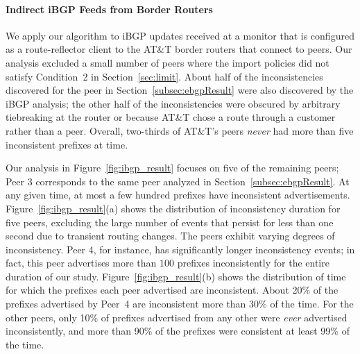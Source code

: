 \paragraph{Indirect iBGP Feeds from Border Routers} \label{subsec:ibgpResult}


We apply our algorithm to iBGP updates received at a monitor that is
configured as a route-reflector client to the AT\&T border routers
that connect to peers.  Our analysis excluded a small number of peers
where the import policies did not satisfy Condition~2 in
Section~\ref{sec:limit}.  About half of the inconsistencies discovered
for the peer in Section~\ref{subsec:ebgpResult} were also discovered
by the iBGP analysis; the other half of the inconsistencies were
obscured by arbitrary tiebreaking at the router or because AT\&T
chose a route through a customer rather than a peer.  Overall,
two-thirds of AT\&T's peers {\em never\/} had more than five
inconsistent prefixes at time.

Our analysis in Figure~\ref{fig:ibgp_result} focuses on five of the
remaining peers; Peer 3 corresponds to the same peer analyzed in
Section~\ref{subsec:ebgpResult}.  At any given time, at most a few
hundred prefixes have inconsistent advertisements.
Figure~\ref{fig:ibgp_result}(a) shows the distribution of
inconsistency duration for five peers, excluding the large number of
events that persist for less than one second due to transient routing
changes.  The peers exhibit varying degrees of inconsistency.  Peer 4,
for instance, has significantly longer inconsistency events; in fact,
this peer advertises more than $100$ prefixes inconsistently for the
entire duration of our study.
Figure~\ref{fig:ibgp_result}(b) shows the distribution of time for
which the prefixes each peer advertised are inconsistent.  About 20\% of
the prefixes advertised by Peer~4 are inconsistent more than 30\% of the
time.
For the other peers, only 10\% of prefixes advertised from any other
were {\em ever\/} advertised inconsistently, and more than 90\% of the
prefixes were consistent at least 99\% of the time.

